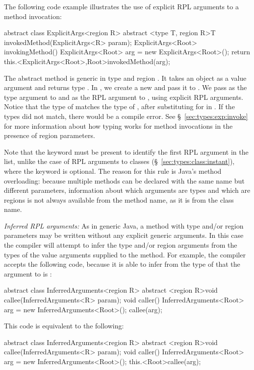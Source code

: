 The following code example illustrates the use of explicit RPL
arguments to a method invocation:
%
\begin{dpjlisting}
abstract class ExplicitArgs<region R> {
    abstract <type T, region R>T invokedMethod(ExplicitArgs<R> param);
    ExplicitArgs<Root> invokingMethod() {
        ExplicitArgs<Root> arg = new ExplicitArgs<Root>();
        return this.<ExplicitArgs<Root>,Root>invokedMethod(arg);
    }
}
\end{dpjlisting}
%
The abstract method  is generic in type  and
region .  It takes an  object as a value
argument and returns type .  In , we create
a new  and pass it to .  We
pass  as the type argument to  and
 as the RPL argument to , using explicit RPL
arguments.  Notice that the type of  matches the type of
, after substituting  for  in .
If the types did not match, there would be a compile error.  See
\S~\ref{sec:types:exp:invoke} for more information about how typing
works for method invocations in the presence of region parameters.

Note that the keyword  must be present to identify the
first RPL argument in the list, unlike the case of RPL arguments to
classes (\S~\ref{sec:types:class:instant}), where the 
keyword is optional.  The reason for this rule is Java's method
overloading: because multiple methods can be declared with the same
name but different parameters, information about which arguments are
types and which are regions is not always available from the method
name, as it is from the class name.

\noindent
\textit{Inferred RPL arguments:} As in generic Java, a method with
type and/or region parameters may be written without any explicit
generic arguments.  In this case the compiler will attempt to infer
the type and/or region arguments from the types of the value arguments
supplied to the method.  For example, the  compiler accepts
the following code, because it is able to infer from the type
 of  that the argument to
 is :
%
\begin{dpjlisting}
abstract class InferredArguments<region R> {
    abstract <region R>void callee(InferredArguments<R> param);
    void caller() {
        InferredArguments<Root> arg = new InferredArguments<Root>();
        callee(arg);
    }
}
\end{dpjlisting}
%
This code is equivalent to the following:
%
\begin{dpjlisting}
abstract class InferredArguments<region R> {
    abstract <region R>void callee(InferredArguments<R> param);
    void caller() {
        InferredArguments<Root> arg = new InferredArguments<Root>();
        this.<Root>callee(arg);
    }
}
\end{dpjlisting}

